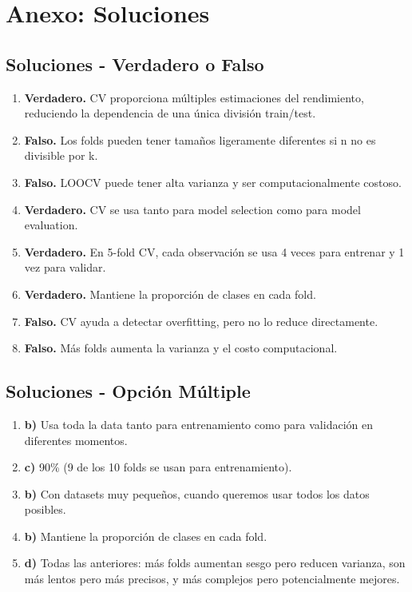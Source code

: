 \documentclass[12pt]{article}
\begin{document}
\newpage

\section{Anexo: Soluciones}

\subsection{Soluciones - Verdadero o Falso}

\begin{enumerate}
    \item \textbf{Verdadero.} CV proporciona múltiples estimaciones del rendimiento, reduciendo la dependencia de una única división train/test.
    \item \textbf{Falso.} Los folds pueden tener tamaños ligeramente diferentes si n no es divisible por k.
    \item \textbf{Falso.} LOOCV puede tener alta varianza y ser computacionalmente costoso.
    \item \textbf{Verdadero.} CV se usa tanto para model selection como para model evaluation.
    \item \textbf{Verdadero.} En 5-fold CV, cada observación se usa 4 veces para entrenar y 1 vez para validar.
    \item \textbf{Verdadero.} Mantiene la proporción de clases en cada fold.
    \item \textbf{Falso.} CV ayuda a detectar overfitting, pero no lo reduce directamente.
    \item \textbf{Falso.} Más folds aumenta la varianza y el costo computacional.
\end{enumerate}

\subsection{Soluciones - Opción Múltiple}

\begin{enumerate}
    \item \textbf{b)} Usa toda la data tanto para entrenamiento como para validación en diferentes momentos.
    \item \textbf{c)} 90\% (9 de los 10 folds se usan para entrenamiento).
    \item \textbf{b)} Con datasets muy pequeños, cuando queremos usar todos los datos posibles.
    \item \textbf{b)} Mantiene la proporción de clases en cada fold.
    \item \textbf{d)} Todas las anteriores: más folds aumentan sesgo pero reducen varianza, son más lentos pero más precisos, y más complejos pero potencialmente mejores.
\end{enumerate}
\end{document}
